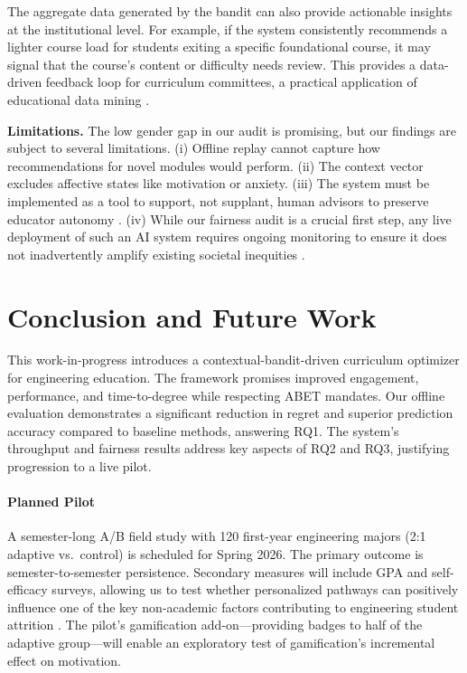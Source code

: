 \documentclass[conference]{IEEEtran}
\begin{document}
The aggregate data generated by the bandit can also provide actionable insights at the institutional level. For example, if the system consistently recommends a lighter course load for students exiting a specific foundational course, it may signal that the course's content or difficulty needs review. This provides a data-driven feedback loop for curriculum committees, a practical application of educational data mining \cite{romero2010}.

\textbf{Limitations.} The low gender gap in our audit is promising, but our findings are subject to several limitations. (i) Offline replay cannot capture how recommendations for novel modules would perform. (ii) The context vector excludes affective states like motivation or anxiety. (iii) The system must be implemented as a tool to support, not supplant, human advisors to preserve educator autonomy \cite{ejjami2024}. (iv) While our fairness audit is a crucial first step, any live deployment of such an AI system requires ongoing monitoring to ensure it does not inadvertently amplify existing societal inequities \cite{ejjami2024}.

\section{Conclusion and Future Work}
This work-in-progress introduces a contextual-bandit-driven curriculum optimizer for engineering education. The framework promises improved engagement, performance, and time-to-degree while respecting ABET mandates. Our offline evaluation demonstrates a significant reduction in regret and superior prediction accuracy compared to baseline methods, answering RQ1. The system's throughput and fairness results address key aspects of RQ2 and RQ3, justifying progression to a live pilot.

\paragraph*{Planned Pilot}
A semester-long A/B field study with 120 first-year engineering majors (2:1 adaptive vs.\ control) is scheduled for Spring 2026. The primary outcome is semester-to-semester persistence. Secondary measures will include GPA and self-efficacy surveys, allowing us to test whether personalized pathways can positively influence one of the key non-academic factors contributing to engineering student attrition \cite{geisinger2013}. The pilot's gamification add-on—providing badges to half of the adaptive group—will enable an exploratory test of gamification’s incremental effect on motivation.
\end{document}
